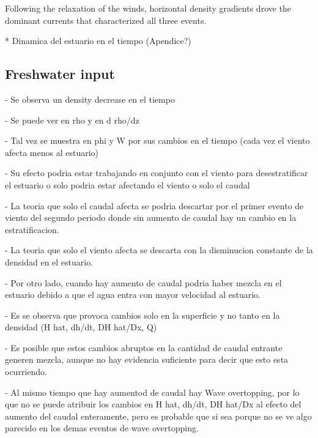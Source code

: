 \documentclass[tesis.tex]{subfiles}
\begin{document}
Following the relaxation of the winds, horizontal density gradients drove the dominant currents that characterized all three events.



* Dinamica del estuario en el tiempo (Apendice?)







\subsection{Freshwater input}

- Se observa un density decrease en el tiempo

- Se puede ver en rho y en d rho/dz 

- Tal vez se muestra en phi y W por sus cambios en el tiempo (cada vez el viento afecta menos al estuario)

- Su efecto podria estar trabajando en conjunto con el viento para desestratificar el estuario o solo podria estar afectando el viento o solo el caudal

- La teoria que solo el caudal afecta se podria descartar por el primer evento de viento del segundo periodo donde sin aumento de caudal hay un cambio en la estratificacion.

- La teoria que solo el viento afecta se descarta con la disminucion constante de la densidad en el estuario.

- Por otro lado, cuando hay aumento de caudal podria haber mezcla en el estuario debido a que el agua entra con mayor velocidad al estuario.

- Es se observa que provoca cambios solo en la superficie y no tanto en la densidad (H hat, dh/dt, DH hat/Dx, Q)

- Es posible que estos cambios abruptos en la cantidad de caudal entrante generen mezcla, aunque no hay evidencia suficiente para decir que esto esta ocurriendo.

- Al mismo tiempo que hay aumentod de caudal hay Wave overtopping, por lo que no se puede atribuir los cambios en H hat, dh/dt, DH hat/Dx al efecto del aumento del caudal enteramente, pero es probable que si sea porque no se ve algo parecido en los demas eventos de wave overtopping.
\end{document}
